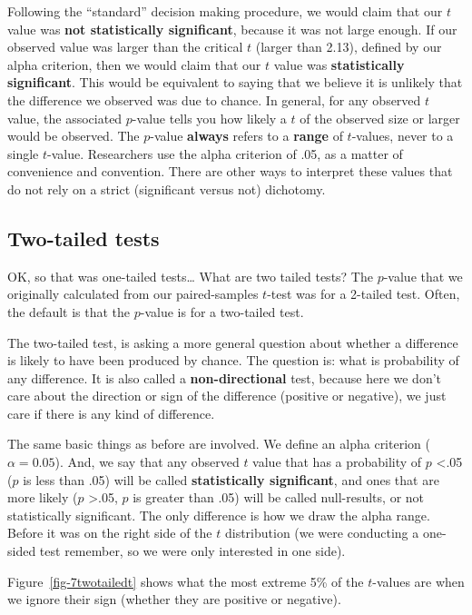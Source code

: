 \documentclass[
  letterpaper,
  DIV=11,
  numbers=noendperiod]{scrreprt}
\begin{document}
Following the ``standard'' decision making procedure, we would claim
that our \(t\) value was \textbf{not statistically significant}, because
it was not large enough. If our observed value was larger than the
critical \(t\) (larger than 2.13), defined by our alpha criterion, then
we would claim that our \(t\) value was \textbf{statistically
significant}. This would be equivalent to saying that we believe it is
unlikely that the difference we observed was due to chance. In general,
for any observed \(t\) value, the associated \(p\)-value tells you how
likely a \(t\) of the observed size or larger would be observed. The
\(p\)-value \textbf{always} refers to a \textbf{range} of \(t\)-values,
never to a single \(t\)-value. Researchers use the alpha criterion of
.05, as a matter of convenience and convention. There are other ways to
interpret these values that do not rely on a strict (significant versus
not) dichotomy.

\subsection{Two-tailed tests}\label{two-tailed-tests}

OK, so that was one-tailed tests\ldots{} What are two tailed tests? The
\(p\)-value that we originally calculated from our paired-samples
\(t\)-test was for a 2-tailed test. Often, the default is that the
\(p\)-value is for a two-tailed test.

The two-tailed test, is asking a more general question about whether a
difference is likely to have been produced by chance. The question is:
what is probability of any difference. It is also called a
\textbf{non-directional} test, because here we don't care about the
direction or sign of the difference (positive or negative), we just care
if there is any kind of difference.

The same basic things as before are involved. We define an alpha
criterion (\(\alpha = 0.05\)). And, we say that any observed \(t\) value
that has a probability of \(p\) \textless.05 (\(p\) is less than .05)
will be called \textbf{statistically significant}, and ones that are
more likely (\(p\) \textgreater.05, \(p\) is greater than .05) will be
called null-results, or not statistically significant. The only
difference is how we draw the alpha range. Before it was on the right
side of the \(t\) distribution (we were conducting a one-sided test
remember, so we were only interested in one side).

Figure~\ref{fig-7twotailedt} shows what the most extreme 5\% of the
\(t\)-values are when we ignore their sign (whether they are positive or
negative).
\end{document}
